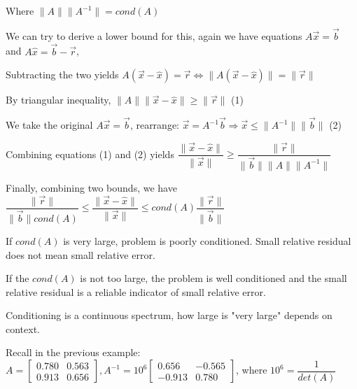 \documentclass{article}
\begin{document}
Where $\|A \| \|A^{-1}\| = cond(A)$

\vspace{0.3cm}

We can try to derive a lower bound for this, again we have equations $A \vec{x} = \vec{b}$ and $A \hat{x} = \vec{b} - \vec{r}$,

Subtracting the two yields $A(\vec{x} - \hat{x}) = \vec{r} \Leftrightarrow \| A (\vec{x} - \hat{x})\| = \| \vec{r} \|$

\vspace{0.2cm}

By triangular inequality, $\| A \| \| \vec{x} - \hat{x} \| \geq \| \vec{r} \|$ (1)

We take the original $A \vec{x} = \vec{b}$, rearrange: $\vec{x} = A^{-1} \vec{b} \Rightarrow \vec{x} \leq \| A^{-1} \| \| \vec{b} \|$ (2)

\vspace{0.2cm}

Combining equations (1) and (2) yields $\dfrac{ \| \vec{x} - \hat{x} \| }{\| \vec{x} \|} \geq \dfrac{ \| \vec{r} \|}{\|\vec{b} \| \|A \| \|A^{-1}\| }$

\vspace{0.3cm}

Finally, combining two bounds, we have $\dfrac{\| \vec{r} \|}{ \| \vec{b} \| cond(A)} \leq \dfrac{\| \vec{x} - \hat{x} \|}{ \| \vec{x} \| } \leq cond(A) \dfrac{\| \vec{r} \|}{\| \vec{b}\|}$

\vspace{0.2cm}

If $cond(A)$ is very large, problem is poorly conditioned. Small relative residual does not mean small relative error.

If the $cond(A)$ is not too large, the problem is well conditioned and the small relative residual is a reliable indicator of small relative error.

Conditioning is a continuous spectrum, how large is "very large" depends on context.



Recall in the previous example: $A = \begin{bmatrix}
0.780 & 0.563\\
0.913 & 0.656
\end{bmatrix}, A^{-1} = 10^6 \begin{bmatrix}
0.656 & - 0.565\\
-0.913 & 0.780
\end{bmatrix}$, where $10^6 = \dfrac{1}{det(A)}$
\end{document}
